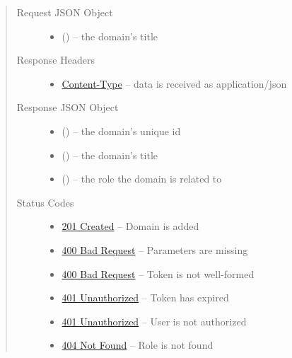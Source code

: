 \documentclass[letterpaper,10pt,english]{sphinxmanual}
\begin{document}
\begin{fulllineitems}
\begin{quote}
\begin{description}
\item[{Request JSON Object}] \leavevmode\begin{itemize}
\item {} 
 () -- the domain's title

\end{itemize}

\item[{Response Headers}] \leavevmode\begin{itemize}
\item {} 
\href{http://tools.ietf.org/html/rfc7231\#section-3.1.1.5}{Content-Type} -- data is received as application/json

\end{itemize}

\item[{Response JSON Object}] \leavevmode\begin{itemize}
\item {} 
 () -- the domain's unique id

\item {} 
 () -- the domain's title

\item {} 
 () -- the role the domain is related to

\end{itemize}

\item[{Status Codes}] \leavevmode\begin{itemize}
\item {} 
\href{http://www.w3.org/Protocols/rfc2616/rfc2616-sec10.html\#sec10.2.2}{201 Created} -- Domain is added

\item {} 
\href{http://www.w3.org/Protocols/rfc2616/rfc2616-sec10.html\#sec10.4.1}{400 Bad Request} -- Parameters are missing

\item {} 
\href{http://www.w3.org/Protocols/rfc2616/rfc2616-sec10.html\#sec10.4.1}{400 Bad Request} -- Token is not well-formed

\item {} 
\href{http://www.w3.org/Protocols/rfc2616/rfc2616-sec10.html\#sec10.4.2}{401 Unauthorized} -- Token has expired

\item {} 
\href{http://www.w3.org/Protocols/rfc2616/rfc2616-sec10.html\#sec10.4.2}{401 Unauthorized} -- User is not authorized

\item {} 
\href{http://www.w3.org/Protocols/rfc2616/rfc2616-sec10.html\#sec10.4.5}{404 Not Found} -- Role is not found

\end{itemize}

\end{description}\end{quote}

\end{fulllineitems}
\end{document}
